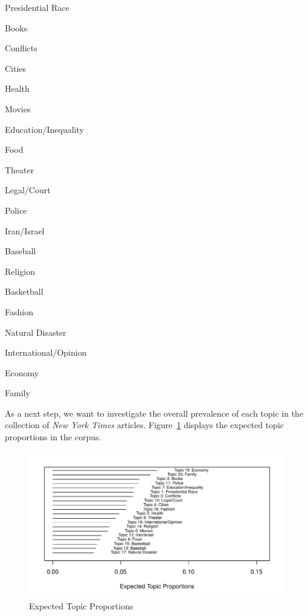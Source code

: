 \documentclass[12pt]{article}
\begin{document}
\begin{doublespace}
\begin{enumerate}\singlespacing
\begin{multicols}{2}
\item Presidential Race \item Books \item Conflicts \item Cities  \item Health 
\item Movies \item Education/Inequality \item Food \item Theater \item Legal/Court 
\columnbreak
\item Police \item Iran/Israel \item Baseball \item Religion \item Basketball 
\item Fashion \item Natural Disaster \item International/Opinion \item Economy \item Family
\end{multicols}
\end{enumerate}

As a next step, we want to investigate the overall prevalence of each topic in the collection of \textit{New York Times} articles. Figure~\ref{fig:prop} displays the expected topic proportions in the corpus.

\begin{figure}
\caption{Expected Topic Proportions}\label{fig:prop}
\includegraphics[width=\textwidth]{../calc/fig/prop} 
\end{figure}


\end{doublespace}
\end{document}
